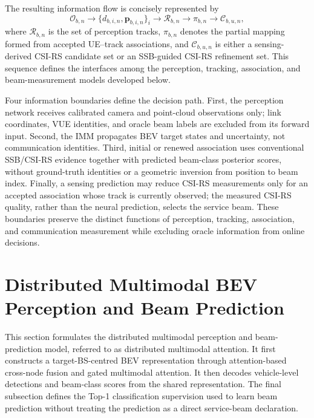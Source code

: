 The resulting information flow is concisely represented by
\begin{equation}
    \mathcal{O}_{b,n}
    \longrightarrow
    \bigl\{d_{b,i,n},\mathbf{p}_{b,i,n}\bigr\}_{i}
    \longrightarrow
    \mathcal{R}_{b,n}
    \longrightarrow
    \pi_{b,n}
    \longrightarrow
    \mathcal{C}_{b,u,n},
    \label{eq:method-decision-path}
\end{equation}
where \(\mathcal{R}_{b,n}\) is the set of perception tracks,
\(\pi_{b,n}\) denotes the partial mapping formed from accepted UE--track
associations, and \(\mathcal{C}_{b,u,n}\) is either a sensing-derived CSI-RS
candidate set or an SSB-guided CSI-RS refinement set.  This sequence defines the
interfaces among the perception, tracking, association, and beam-measurement
models developed below.

Four information boundaries define the decision path.  First, the perception
network receives calibrated camera and point-cloud observations only; link
coordinates, VUE identities, and oracle beam labels are excluded from its
forward input.  Second, the IMM propagates BEV target states and uncertainty,
not communication identities.  Third, initial or renewed association uses
conventional SSB/CSI-RS evidence together with predicted beam-class posterior
scores, without ground-truth identities or a geometric inversion from position to beam
index.
Finally, a sensing prediction may reduce CSI-RS measurements only for an
accepted association whose track is currently observed; the measured CSI-RS quality, rather
than the neural prediction, selects the service beam.  These boundaries preserve
the distinct functions of perception, tracking, association, and communication
measurement while excluding oracle information from online decisions.

\section{Distributed Multimodal BEV Perception and Beam Prediction}
\label{sec:method-perception-learning}

This section formulates the distributed multimodal perception and beam-prediction
model, referred to as distributed multimodal attention.  It first constructs a
target-BS-centred BEV representation through
attention-based cross-node fusion and gated multimodal attention.  It then
decodes vehicle-level detections and beam-class scores from the shared
representation.  The final subsection defines the Top-1 classification
supervision used to learn beam prediction without treating the prediction as a
direct service-beam declaration.

